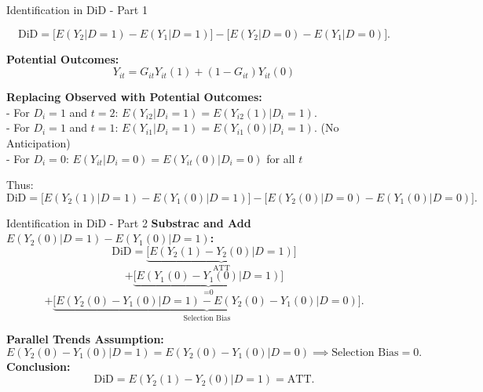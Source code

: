 \documentclass[xcolor=svgnames,t]{beamer}
\begin{document}
    \begin{frame}{Identification in DiD - Part 1}
        \small
        
        \[
        \text{DiD} = \bigl[ E(Y_{2}|D=1) - E(Y_{1}|D=1) \bigr] - \bigl[ E(Y_{2}|D=0) - E(Y_{1}|D=0) \bigr].
        \]
        
        \textbf{Potential Outcomes:}
        \begin{equation*}
            Y_{it} = G_{it} Y_{it}(1) + (1 - G_{it}) Y_{it}(0)
        \end{equation*}
        
        \textbf{Replacing Observed with Potential Outcomes:}\\
        - For $D_i=1$ and $t=2$: $E(Y_{i2}|D_i=1)=E(Y_{i2}(1)|D_i=1)$. \\
        - For $D_i=1$ and $t=1$: $E(Y_{i1}|D_i=1)=E(Y_{i1}(0)|D_i=1)$. (No Anticipation) \\
        - For $D_i=0$: $E(Y_{it}|D_i=0)=E(Y_{it}(0)|D_i=0)$ for all $t$
        
        Thus:
        \[
        \text{DiD} = \bigl[E(Y_{2}(1)|D=1)-E(Y_{1}(0)|D=1)\bigr] - \bigl[E(Y_{2}(0)|D=0)-E(Y_{1}(0)|D=0)\bigr].
        \]
        \end{frame}
        
        \begin{frame}{Identification in DiD - Part 2}
        \small
        \textbf{Substrac and Add $E(Y_{2}(0)|D=1)-E(Y_{1}(0)|D=1)$:}
        \[
        \text{DiD} = \underbrace{\bigl[E(Y_{2}(1)-Y_{2}(0)|D=1)\bigr]}_{\text{ATT}}
        \]
        \[
            + \underbrace{\bigl[E(Y_{1}(0)-Y_{1}(0)|D=1)\bigr]}_{\text{=0}}
            \]
        \[
        + \underbrace{\bigl[E(Y_{2}(0)-Y_{1}(0)|D=1)-E(Y_{2}(0)-Y_{1}(0)|D=0)\bigr]}_{\text{Selection Bias}}.
        \]
        
        \pause
        \textbf{Parallel Trends Assumption:}
        \[
        E(Y_{2}(0)-Y_{1}(0)|D=1)=E(Y_{2}(0)-Y_{1}(0)|D=0) \implies \text{Selection Bias}=0.
        \]
        \pause
        \textbf{Conclusion:}
        \[
        \text{DiD}=E(Y_{2}(1)-Y_{2}(0)|D=1)=\text{ATT}.
        \]
        \end{frame}
        
        
    
    
    
\end{document}
